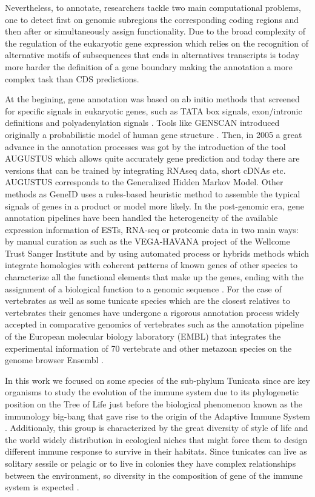 \documentclass[11pt]{article}
\begin{document}
Nevertheless, to annotate, researchers tackle two main computational problems, 
one to detect first on genomic subregions the corresponding coding regions and 
then after or simultaneously assign functionality. Due to the broad complexity 
of the regulation of the eukaryotic gene expression which relies on 
the recognition of alternative motifs of subsequences that ends in alternatives 
transcripts is today more harder the definition of a gene boundary making the 
annotation a more complex task than CDS predictions\cite{yandell2012}. 

At the begining, gene annotation was based on ab initio methods that screened 
for  specific signals  in eukaryotic genes, such as TATA box signals, 
exon/intronic definitions and polyadenylation signals \cite{claverie}. Tools 
like GENSCAN introduced originally a probabilistic model of human gene structure 
\cite{genescan}. Then, in 2005 a great advance in the annotation processes was 
got by the introduction of the tool AUGUSTUS \cite{augustus} which allows quite 
accurately gene prediction and today there are versions that can be trained by 
integrating RNAseq data, short cDNAs etc. AUGUSTUS corresponds to the 
Generalized Hidden Markov Model. Other methods as GeneID uses a rules-based 
heuristic method to assemble the typical signals of genes in a product or model 
more likely. In the post-genomic era, gene annotation pipelines have been 
handled the heterogeneity of the available expression information of ESTs, 
RNA-seq or proteomic data in two main ways: by manual curation as such as the 
VEGA-HAVANA project of the Wellcome Trust Sanger Institute and by using 
automated process or hybrids methods which integrate homologies with coherent 
patterns of known genes of other species to characterize all the functional 
elements that make up the genes, ending with the assignment of a biological 
function to a genomic sequence \cite{aken2016ensembl} \cite{birney2004overview}. 
For the case of vertebrates as well as some tunicate species which are the 
closest relatives to vertebrates \cite{delsuc2006} their genomes have undergone 
a rigorous annotation process widely accepted in comparative genomics of 
vertebrates such as the annotation pipeline of the European molecular biology 
laboratory (EMBL) that integrates the experimental information of 70 vertebrate 
and other metazoan species on the genome browser Ensembl \cite{aken2016ensembl}.

In this work we focused on some species of the sub-phylum Tunicata since are 
key organisms to study the evolution of the immune system due to its 
phylogenetic position on the Tree of Life just before the biological phenomenon 
known as the immunology big-bang that gave rise to the origin of the Adaptive 
Immune System \cite{bernstein1996}. Additionaly, this group is characterized by 
the great diversity of style of life and the world widely distribution in 
ecological niches that might force them to design different immune response to 
survive in their habitats. Since tunicates can live as solitary sessile or 
pelagic or to live in colonies they have complex relationships between the 
environment, so diversity in the composition of gene of the immune system is 
expected  \cite{carroll2008evo, berna2014evolutionary}. 
\end{document}
